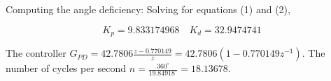 Computing the angle deficiency:
Solving for equations (1) and (2),

\[ 
K_p=9.833174968 \quad  K_d=32.9474741
\]

The controller $\displaystyle G_{PD}=42.7806\frac{z-0.770149}{z} = 42.7806(1-0.770149z^{-1})$. The number of cycles per second $n=\frac{360^\circ}{19.84918^\circ}=18.13678$.



